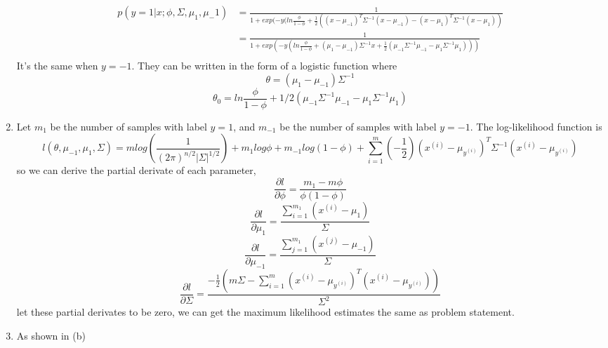 \documentclass[12pt]{article}
\begin{document}
\begin{enumerate}[label=(\alph*)]
    \begin{equation*} 
        \begin{split}
            p(y=1|x;\phi, \Sigma, \mu_1, \mu_-1)
             &= \frac{1}{1+exp(-y(ln\frac{\phi}{1-\phi}+\frac{1}{2}((x-\mu_{-1})^T\Sigma^{-1}(x-\mu_{-1})-(x-\mu_{1})^T\Sigma^{-1}(x-\mu_{1}))} \\
             &= \frac{1}{1+exp(-y(ln\frac{\phi}{1-\phi}+(\mu_1-\mu_{-1})\Sigma^{-1}x+\frac{1}{2}(\mu_{-1}\Sigma^{-1}\mu_{-1}-\mu_{1}\Sigma^{-1}\mu_{1})))} \\
        \end{split}
    \end{equation*} 
    It's the same when $y=-1$. They can be written in the form of a logistic function where
    $$ \theta = (\mu_1-\mu_{-1})\Sigma^{-1} $$
    $$ \theta_0 = ln\frac{\phi}{1-\phi} + 1/2(\mu_{-1}\Sigma^{-1}\mu_{-1}-\mu_{1}\Sigma^{-1}\mu_{1}) $$

    \item 
    Let $m_1$ be the number of samples with label $y=1$, and $m_{-1}$ be the number of samples with label $y=-1$.
    The log-likelihood function is
    $$ l(\theta,\mu_{-1}, \mu_1, \Sigma)
       = mlog(\frac{1}{(2\pi)^{n/2}|\Sigma|^{1/2}})+m_1log\phi+m_{-1}log(1-\phi)
        +\sum_{i=1}^{m}(-\frac{1}{2})(x^{(i)}-\mu_{y^{(i)}})^T\Sigma^{-1}(x^{(i)}-\mu_{y^{(i)}}) $$
    so we can derive the partial derivate of each parameter,
    $$ \frac{\partial l}{\partial \phi} = \frac{m_1-m\phi}{\phi(1-\phi)}$$
    $$ \frac{\partial l}{\partial \mu_1} = \frac{\sum_{i=1}^{m_1}(x^{(i)}-\mu_1)}{\Sigma}$$
    $$ \frac{\partial l}{\partial \mu_{-1}} = \frac{\sum_{j=1}^{m_1}(x^{(j)}-\mu_{-1})}{\Sigma}$$
    $$ \frac{\partial l}{\partial \Sigma} = \frac{-\frac{1}{2}(m\Sigma-\sum_{i=1}^{m}(x^{(i)}-\mu_{y^(i)})^T(x^{(i)}-\mu_{y^(i)}))}{\Sigma^{2}}$$
    let these partial derivates to be zero, we can get the maximum likelihood estimates the same as problem statement. 

    \item
    As shown in (b)
    \end{enumerate}

    \newpage
\end{document}
